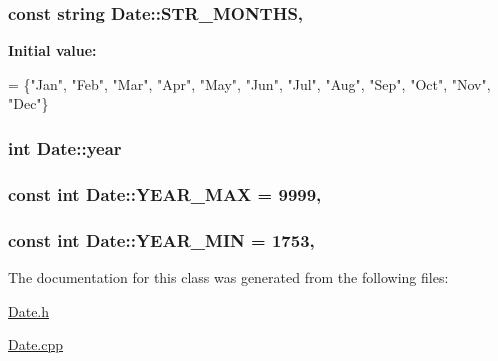 \subsubsection[{\texorpdfstring{S\+T\+R\+\_\+\+M\+O\+N\+T\+HS}{STR_MONTHS}}]{\setlength{\rightskip}{0pt plus 5cm}const string Date\+::\+S\+T\+R\+\_\+\+M\+O\+N\+T\+HS\hspace{0.3cm}{\ttfamily [static]}, {\ttfamily [private]}}\hypertarget{classDate_a384a8a994b7f860051bc83e61a49a5f8}{}\label{classDate_a384a8a994b7f860051bc83e61a49a5f8}
{\bfseries Initial value\+:}
\begin{DoxyCode}
= \{\textcolor{stringliteral}{"Jan"}, \textcolor{stringliteral}{"Feb"}, \textcolor{stringliteral}{"Mar"}, \textcolor{stringliteral}{"Apr"}, \textcolor{stringliteral}{"May"}, \textcolor{stringliteral}{"Jun"},
                                   \textcolor{stringliteral}{"Jul"}, \textcolor{stringliteral}{"Aug"}, \textcolor{stringliteral}{"Sep"}, \textcolor{stringliteral}{"Oct"}, \textcolor{stringliteral}{"Nov"}, \textcolor{stringliteral}{"Dec"}\}
\end{DoxyCode}
\subsubsection[{\texorpdfstring{year}{year}}]{\setlength{\rightskip}{0pt plus 5cm}int Date\+::year\hspace{0.3cm}{\ttfamily [private]}}\hypertarget{classDate_a3eeced2ed56bc95d56782b9e738db8ea}{}\label{classDate_a3eeced2ed56bc95d56782b9e738db8ea}
\subsubsection[{\texorpdfstring{Y\+E\+A\+R\+\_\+\+M\+AX}{YEAR_MAX}}]{\setlength{\rightskip}{0pt plus 5cm}const int Date\+::\+Y\+E\+A\+R\+\_\+\+M\+AX = 9999\hspace{0.3cm}{\ttfamily [static]}, {\ttfamily [private]}}\hypertarget{classDate_aded4c3bb2f76583cfc3da4f6932f3af1}{}\label{classDate_aded4c3bb2f76583cfc3da4f6932f3af1}
\subsubsection[{\texorpdfstring{Y\+E\+A\+R\+\_\+\+M\+IN}{YEAR_MIN}}]{\setlength{\rightskip}{0pt plus 5cm}const int Date\+::\+Y\+E\+A\+R\+\_\+\+M\+IN = 1753\hspace{0.3cm}{\ttfamily [static]}, {\ttfamily [private]}}\hypertarget{classDate_a2c6e3f38e03c9de55218098acf40537f}{}\label{classDate_a2c6e3f38e03c9de55218098acf40537f}


The documentation for this class was generated from the following files\+:\begin{DoxyCompactItemize}
\item 
\hyperlink{Date_8h}{Date.\+h}\item 
\hyperlink{Date_8cpp}{Date.\+cpp}\end{DoxyCompactItemize}
